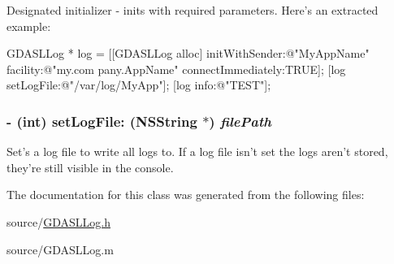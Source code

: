 Designated initializer -\/ inits with required parameters. Here's an extracted example: 
\begin{DoxyCode}
 GDASLLog * log = [[GDASLLog alloc] initWithSender:@"MyAppName" facility:@"my.com
      pany.AppName" connectImmediately:TRUE];
 [log setLogFile:@"/var/log/MyApp"];
 [log info:@"TEST"];
\end{DoxyCode}
 \hypertarget{interface_g_d_a_s_l_log_a60c2903d8fb00b34fafe5c2c1965f811}{
\subsubsection[{setLogFile:}]{\setlength{\rightskip}{0pt plus 5cm}-\/ (int) setLogFile: ({\bf NSString} $\ast$) {\em filePath}}}
\label{interface_g_d_a_s_l_log_a60c2903d8fb00b34fafe5c2c1965f811}


Set's a log file to write all logs to. If a log file isn't set the logs aren't stored, they're still visible in the console. 

The documentation for this class was generated from the following files:\begin{DoxyCompactItemize}
\item 
source/\hyperlink{_g_d_a_s_l_log_8h}{GDASLLog.h}\item 
source/GDASLLog.m\end{DoxyCompactItemize}
